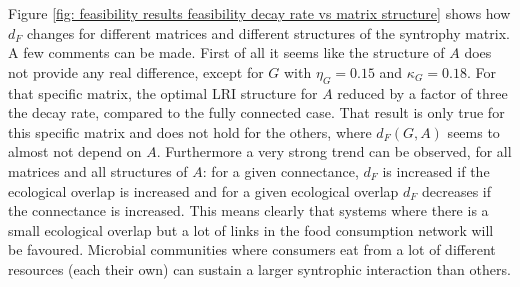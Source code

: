 \documentclass[12pt, titlepage]{report}
\begin{document}
  Figure \ref{fig: feasibility results feasibility decay rate vs matrix structure} shows how $d_F$ changes for different matrices and different structures of the syntrophy matrix. A few comments can be made. First of all it seems like the structure of $A$ does not provide any real difference, except for $G$ with $\eta_G=0.15$ and $\kappa_G=0.18$. For that specific matrix, the optimal LRI structure for $A$ reduced by a factor of three the decay rate, compared to the fully connected case. That result is only true for this specific matrix and does not hold for the others, where $d_F(G,A)$ seems to almost not depend on $A$. Furthermore a very strong trend can be observed, for all matrices and all structures of $A$: for a given connectance, $d_F$ is increased if the ecological overlap is increased and for a given ecological overlap $d_F$ decreases if the connectance is increased.
  This means clearly that systems where there is a small ecological overlap but a lot of links in the food consumption network will be favoured. Microbial communities where consumers eat from a lot of different resources (\ie each their own) can sustain a larger syntrophic interaction than others.
\end{document}
